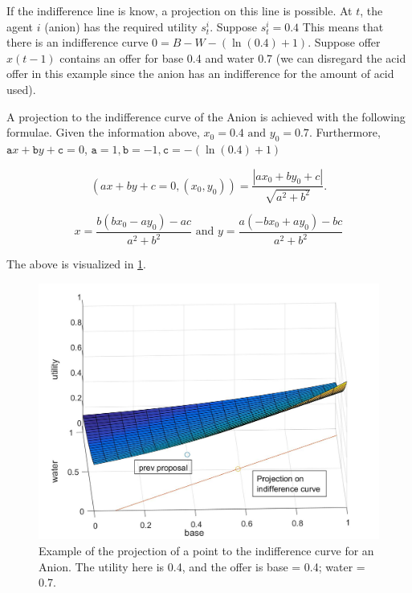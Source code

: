 If the indifference line is know, a projection on this line is possible. 
At $t$, the agent $i$ (anion) has the required utility $s^i_t$. Suppose $s^i_t = 0.4$ This means that there is an indifference curve $0 = B - W - (\ln(0.4)+1)$. Suppose offer $x(t-1)$ contains an offer for base 0.4 and water 0.7 (we can disregard the acid offer in this example since the anion has an indifference for the amount of acid used). 

A projection to the indifference curve of the Anion is achieved with the following formulae. Given the information above, $x_0 = 0.4 \text{ and } y_0 = 0.7$. Furthermore, $\texttt{a} x + \texttt{b} y + \texttt{c} = 0$, $\texttt{a} = 1, \texttt{b} = -1, \texttt{c} = -(\ln(0.4)+1)$

\[(ax+by+c=0, (x_0, y_0)) = \frac{|ax_0+by_0+c|}{\sqrt{a^2+b^2}}. \]

\[x = \frac{b(bx_0 - ay_0)-ac}{a^2 + b^2} \text{ and } y = \frac{a(-bx_0 + ay_0) - bc}{a^2+b^2}\]

The above is visualized in \cref{fig:projectionanionexample}.
\begin{figure}[h]
	\centering
	\includegraphics[width=0.7\linewidth]{img/projection_anion_example}
	\caption{Example of the projection of a point to the indifference curve for an Anion. The utility here is 0.4, and the offer is base = 0.4; water = 0.7.}
	\label{fig:projectionanionexample}
\end{figure}








